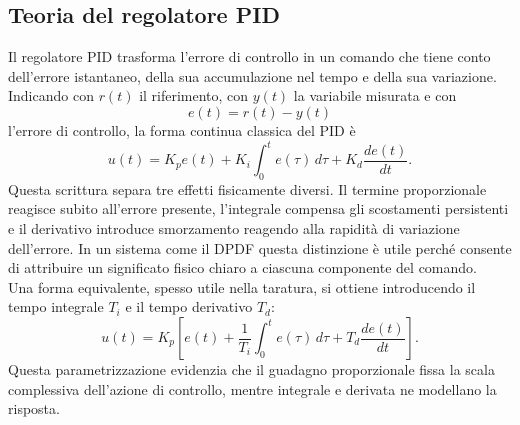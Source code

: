 \documentclass[11pt]{report}
\begin{document}
	\subsection{Teoria del regolatore PID}
	Il regolatore PID trasforma l'errore di controllo in un comando che tiene conto dell'errore istantaneo, della sua accumulazione nel tempo e della sua variazione. Indicando con $r(t)$ il riferimento, con $y(t)$ la variabile misurata e con
	\begin{equation}
		e(t)=r(t)-y(t)
	\end{equation}
	l'errore di controllo, la forma continua classica del PID è
	\begin{equation}
		u(t)=K_p e(t) + K_i \int_0^t e(\tau)\,d\tau + K_d\frac{de(t)}{dt}.
	\end{equation}
	Questa scrittura separa tre effetti fisicamente diversi. Il termine proporzionale reagisce subito all'errore presente, l'integrale compensa gli scostamenti persistenti e il derivativo introduce smorzamento reagendo alla rapidità di variazione dell'errore. In un sistema come il DPDF questa distinzione è utile perché consente di attribuire un significato fisico chiaro a ciascuna componente del comando.\\
	Una forma equivalente, spesso utile nella taratura, si ottiene introducendo il tempo integrale $T_i$ e il tempo derivativo $T_d$:
	\begin{equation}
		u(t)=K_p\left[e(t)+\frac{1}{T_i}\int_0^t e(\tau)\,d\tau + T_d\frac{de(t)}{dt}\right].
	\end{equation}
	Questa parametrizzazione evidenzia che il guadagno proporzionale fissa la scala complessiva dell'azione di controllo, mentre integrale e derivata ne modellano la risposta.
	
\end{document}
